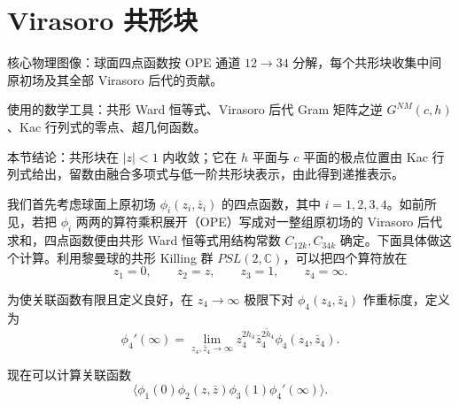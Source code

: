 
\section{Virasoro 共形块}\label{sec:3}

\begin{keytakeaways}
  \item 核心物理图像：球面四点函数按 OPE 通道 $12\to 34$ 分解，每个共形块收集中间原初场及其全部 Virasoro 后代的贡献。
  \item 使用的数学工具：共形 Ward 恒等式、Virasoro 后代 Gram 矩阵之逆 $G^{NM}(c,h)$、Kac 行列式的零点、超几何函数。
  \item 本节结论：共形块在 $|z|<1$ 内收敛；它在 $h$ 平面与 $c$ 平面的极点位置由 Kac 行列式给出，留数由融合多项式与低一阶共形块表示，由此得到递推表示。
\end{keytakeaways}

我们首先考虑球面上原初场 $\phi_i(z_i,\bar z_i)$ 的四点函数，其中 $i=1,2,3,4$。如前所见，若把 $\phi_i$ 两两的算符乘积展开（OPE）写成对一整组原初场的 Virasoro 后代求和，四点函数便由共形 Ward 恒等式用结构常数 $C_{12k},C_{34k}$ 确定。下面具体做这个计算。利用黎曼球的共形 Killing 群 $PSL(2,\mathbb{C})$，可以把四个算符放在
\begin{equation}\label{eq:3-1}
  z_1=0,\qquad z_2=z,\qquad z_3=1,\qquad z_4=\infty .
\end{equation}

为使关联函数有限且定义良好，在 $z_4\to\infty$ 极限下对 $\phi_4(z_4,\bar z_4)$ 作重标度，定义为
\begin{equation}\label{eq:3-2}
  \phi_4'(\infty)=\lim_{z_4,\bar z_4\to\infty} z_4^{2h_4}\bar z_4^{2\tilde h_4}\phi_4(z_4,\bar z_4).
\end{equation}


现在可以计算关联函数
\begin{equation}\label{eq:3-3}
  \langle\phi_1(0)\phi_2(z,\bar z)\phi_3(1)\phi_4'(\infty)\rangle .
\end{equation}

